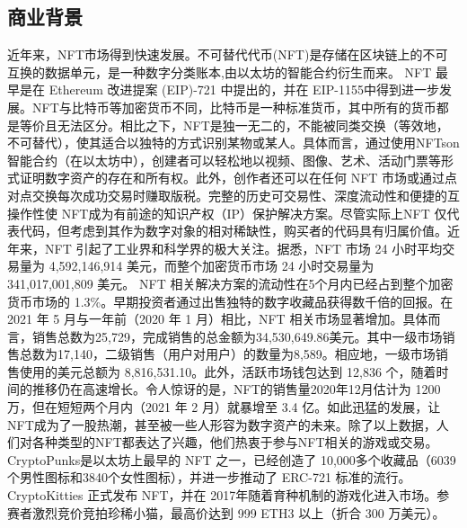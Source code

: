 \documentclass{article}
\begin{document}
\subsection{商业背景}
\par 近年来，NFT市场得到快速发展。不可替代代币(NFT)是存储在区块链上的不可互换的数据单元，是一种数字分类账本\cite{wikiNFT},由以太坊的智能合约衍生而来。 NFT 最早是在 Ethereum 改进提案 (EIP)-721 \cite{wang2021non} 中提出的，并在 EIP-1155中得到进一步发展。NFT与比特币等加密货币不同，比特币是一种标准货币，其中所有的货币都是等价且无法区分。相比之下，NFT是独一无二的，不能被同类交换（等效地，不可替代），使其适合以独特的方式识别某物或某人。具体而言，通过使用NFTson智能合约（在以太坊中），创建者可以轻松地以视频、图像、艺术、活动门票等形式证明数字资产的存在和所有权。此外，创作者还可以在任何 NFT 市场或通过点对点交换每次成功交易时赚取版税。完整的历史可交易性、深度流动性和便捷的互操作性使 NFT成为有前途的知识产权（IP）保护解决方案。尽管实际上NFT 仅代表代码，但考虑到其作为数字对象的相对稀缺性，购买者的代码具有归属价值。近年来，NFT 引起了工业界和科学界的极大关注。据悉，NFT 市场 24 小时平均交易量为 4,592,146,914 美元，而整个加密货币市场 24 小时交易量为 341,017,001,809 美元。 NFT 相关解决方案的流动性在5个月内已经占到整个加密货币市场的 1.3\%。早期投资者通过出售独特的数字收藏品获得数千倍的回报。在2021 年 5 月与一年前（2020 年 1 月）相比，NFT 相关市场显著增加。具体而言，销售总数为25,729，完成销售的总金额为34,530,649.86美元。其中一级市场销售总数为17,140，二级销售（用户对用户）的数量为8,589。相应地，一级市场销售使用的美元总额为 8,816,531.10。此外，活跃市场钱包达到 12,836 个，随着时间的推移仍在高速增长。令人惊讶的是，NFT的销售量2020年12月估计为 1200 万，但在短短两个月内（2021 年 2 月）就暴增至 3.4 亿。如此迅猛的发展，让NFT成为了一股热潮，甚至被一些人形容为数字资产的未来。除了以上数据，人们对各种类型的NFT都表达了兴趣，他们热衷于参与NFT相关的游戏或交易。 CryptoPunks\cite{CryptoPunks}是以太坊上最早的 NFT 之一，已经创造了 10,000多个收藏品（6039个男性图标和3840个女性图标），并进一步推动了 ERC-721 标准的流行。 CryptoKitties\cite{CryptoKitties2022Jan} 正式发布 NFT，并在 2017年随着育种机制的游戏化进入市场。参赛者激烈竞价竞拍珍稀小猫，最高价达到 999 ETH3 以上（折合 300 万美元）。
\end{document}
